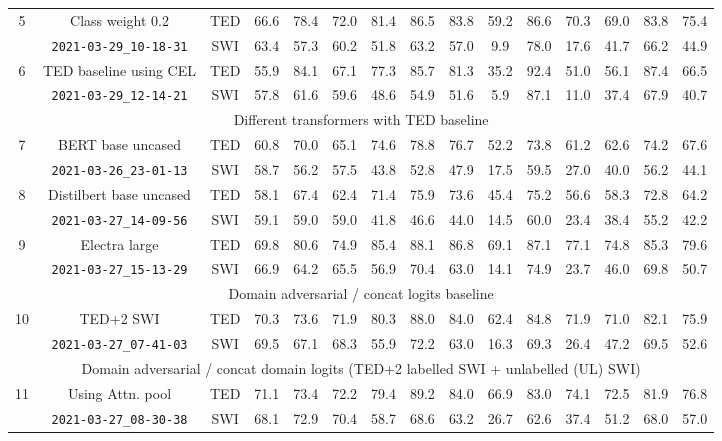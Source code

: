 \documentclass[a4paper]{article}
\begin{document}
\begin{multicols}{2}
\begin{table*}[t]
\begin{tabular}{|c|c|c|c c c|c c c|c c c|c c c|}
\multirow{2}{*}{5}&
Class weight 0.2&TED&66.6&78.4&72.0&81.4&86.5&83.8&59.2&86.6&70.3&69.0&83.8&75.4\\&
\verb|2021-03-29_10-18-31|&SWI&63.4&57.3&60.2&51.8&63.2&57.0& 9.9&78.0&17.6&41.7&66.2&44.9\\\hline
\multirow{2}{*}{6}&
TED baseline using CEL&TED&55.9&84.1&67.1&77.3&85.7&81.3&35.2&92.4&51.0&56.1&87.4&66.5\\&
\verb|2021-03-29_12-14-21|&SWI&57.8&61.6&59.6&48.6&54.9&51.6& 5.9&87.1&11.0&37.4&67.9&40.7\\\hline

\multicolumn{15}{|c|}{Different transformers with TED baseline}\\\hline
\multirow{2}{*}{7}&
BERT base uncased&TED&60.8&70.0&65.1&74.6&78.8&76.7&52.2&73.8&61.2&62.6&74.2&67.6\\&
\verb|2021-03-26_23-01-13|&SWI&58.7&56.2&57.5&43.8&52.8&47.9&17.5&59.5&27.0&40.0&56.2&44.1\\\hline
\multirow{2}{*}{8}&
Distilbert base uncased&TED&58.1&67.4&62.4&71.4&75.9&73.6&45.4&75.2&56.6&58.3&72.8&64.2\\&
\verb|2021-03-27_14-09-56|&SWI&59.1&59.0&59.0&41.8&46.6&44.0&14.5&60.0&23.4&38.4&55.2&42.2\\\hline

\multirow{2}{*}{9}&
Electra large&TED&69.8&80.6&74.9&85.4&88.1&86.8&69.1&87.1&77.1&74.8&85.3&79.6\\&
\verb|2021-03-27_15-13-29|&SWI&66.9&64.2&65.5&56.9&70.4&63.0&14.1&74.9&23.7&46.0&69.8&50.7\\\hline


\multicolumn{15}{|c|}{Domain adversarial / concat logits baseline}\\\hline

\multirow{2}{*}{10}&
TED+2 SWI&TED&70.3&73.6&71.9&80.3&88.0&84.0&62.4&84.8&71.9&71.0&82.1&75.9\\&
\verb|2021-03-27_07-41-03|&SWI&69.5&67.1&68.3&55.9&72.2&63.0&16.3&69.3&26.4&47.2&69.5&52.6\\\hline

\multicolumn{15}{|c|}{Domain adversarial / concat domain logits (TED+2 labelled SWI + unlabelled (UL) SWI)}\\\hline

\multirow{2}{*}{11}&
Using Attn. pool&TED&71.1&73.4&72.2&79.4&89.2&84.0&66.9&83.0&74.1&72.5&81.9&76.8\\&
\verb|2021-03-27_08-30-38|&SWI&68.1&72.9&70.4&58.7&68.6&63.2&26.7&62.6&37.4&51.2&68.0&57.0\\\hline


\end{tabular}
\end{table*}
\end{multicols}
\end{document}
